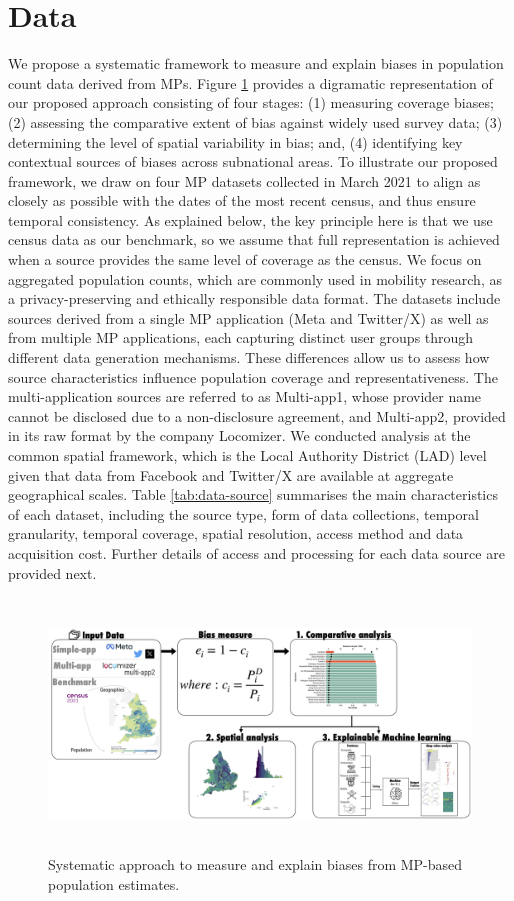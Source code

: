 \documentclass[]{rsos}%
\begin{document}
\section{Data}\label{sec-data}

We propose a systematic framework to measure and explain biases in
population count data derived from MPs. Figure
\ref{fig:debias-approach} provides a digramatic representation of our
proposed approach consisting of four stages: (1) measuring coverage
biases; (2) assessing the comparative extent of bias against widely used
survey data; (3) determining the level of spatial variability in bias;
and, (4) identifying key contextual sources of biases across subnational
areas. To illustrate our proposed framework, we draw on four MP datasets
collected in March 2021 to align as closely as possible with the dates
of the most recent census, and thus ensure temporal consistency. As
explained below, the key principle here is that we use census data as
our benchmark, so we assume that full representation is achieved when a
source provides the same level of coverage as the census. We focus on
aggregated population counts, which are commonly used in mobility
research, as a privacy-preserving and ethically responsible data format.
The datasets include sources derived from a single MP application (Meta
and Twitter/X) as well as from multiple MP applications, each capturing
distinct user groups through different data generation mechanisms. These
differences allow us to assess how source characteristics influence
population coverage and representativeness. The multi-application
sources are referred to as Multi-app1, whose provider name cannot be
disclosed due to a non-disclosure agreement, and Multi-app2, provided in
its raw format by the company Locomizer. We conducted analysis at the common spatial framework, which is the Local Authority District (LAD) level given that data from Facebook and Twitter/X are available at aggregate geographical scales. Table
\ref{tab:data-source} summarises the main characteristics of each
dataset, including the source type, form of data collections, temporal
granularity, temporal coverage, spatial resolution, access method and
data acquisition cost. Further details of access and processing for each
data source are provided next.

\begin{figure}
\centering
\includegraphics[width=13cm,height=6.7cm]{figures/debias-approach.png}
\caption{Systematic approach to measure and explain biases from MP-based
population estimates.}\label{fig:debias-approach}
\end{figure}
\end{document}
